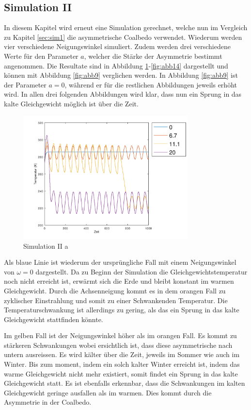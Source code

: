 \begin{refsection}
\subsection{Simulation II} \label{sim2} 
In diesem Kapitel wird erneut eine Simulation gerechnet, welche nun im Vergleich zu Kapitel \ref{sec:sim1} die asymmetrische Coalbedo verwendet. Wiederum werden vier verschiedene Neigungswinkel simuliert. Zudem werden drei verschiedene Werte für den Parameter $a$, welcher die Stärke der Asymmetrie bestimmt angenommen. Die Resultate sind in Abbildung \ref{fig:abb12}-\ref{fig:abb14} dargestellt und können mit Abbildung \ref{fig:abb9} verglichen werden. In Abbildung \ref{fig:abb9} ist der Parameter $a=0$, während er für die restlichen Abbildungen jeweils erhöht wird. In allen drei folgenden Abbildungen wird klar, dass nun ein Sprung in das kalte Gleichgewicht möglich ist über die Zeit. 
%
\begin{figure}
	\centering
	\includegraphics[width= 0.8\textwidth]{Zeitachse_1.png}
	\caption[Simulation II a]{Simulation II a}
	\label{fig:abb12}
\end{figure}
%
Als blaue Linie ist wiederum der ursprüngliche Fall mit einem Neigungswinkel von $\omega=0$ dargestellt. Da zu Beginn der Simulation die Gleichgewichtstemperatur noch nicht erreicht ist, erwärmt sich die Erde und bleibt konstant im warmen Gleichgewicht. Durch die Achsenneigung kommt es in dem orangen Fall zu zyklischer Einstrahlung und somit zu einer Schwankenden Temperatur. Die Temperaturschwankung ist allerdings zu gering, als das ein Sprung in das kalte Gleichgewicht stattfinden könnte. 

Im gelben Fall ist der Neigungswinkel höher als im orangen Fall. Es kommt zu stärkeren Schwankungen wobei ersichtlich ist, dass diese asymmetrische nach untern ausreissen. Es wird kälter über die  Zeit, jeweils im Sommer wie auch im Winter. Bis zum moment, indem ein solch kalter Winter erreicht ist, indem das warme Gleichgewicht nicht mehr existiert, somit findet ein Sprung in das kalte Gleichgewicht statt. Es ist ebenfalls erkennbar, dass die Schwankungen im kalten Gleichgewicht geringe ausfallen als im warmen. Dies kommt durch die Asymmetrie in der Coalbedo.


\end{refsection}
